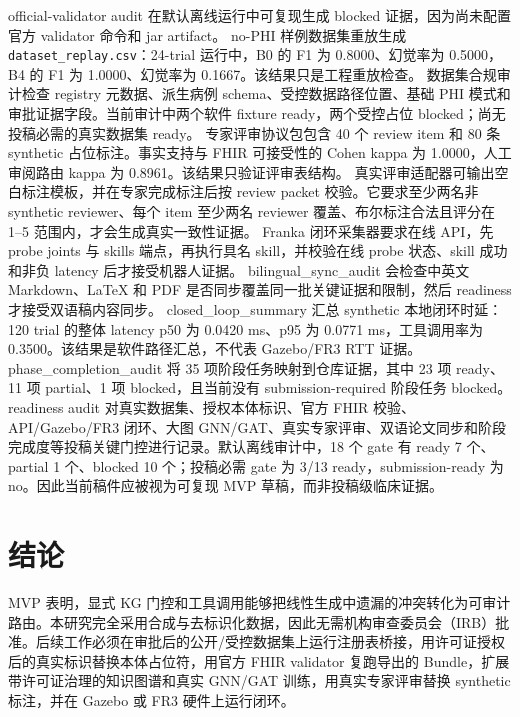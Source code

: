 \documentclass[11pt]{article}
\begin{document}
official-validator audit 在默认离线运行中可复现生成 blocked 证据，因为尚未配置官方 validator 命令和 jar artifact。
no-PHI 样例数据集重放生成 \texttt{dataset\_replay.csv}：24-trial 运行中，B0 的 F1 为 0.8000、幻觉率为 0.5000，B4 的 F1 为 1.0000、幻觉率为 0.1667。该结果只是工程重放检查。
数据集合规审计检查 registry 元数据、派生病例 schema、受控数据路径位置、基础 PHI 模式和审批证据字段。当前审计中两个软件 fixture ready，两个受控占位 blocked；尚无投稿必需的真实数据集 ready。
专家评审协议包包含 40 个 review item 和 80 条 synthetic 占位标注。事实支持与 FHIR 可接受性的 Cohen kappa 为 1.0000，人工审阅路由 kappa 为 0.8961。该结果只验证评审表结构。
真实评审适配器可输出空白标注模板，并在专家完成标注后按 review packet 校验。它要求至少两名非 synthetic reviewer、每个 item 至少两名 reviewer 覆盖、布尔标注合法且评分在 1--5 范围内，才会生成真实一致性证据。
Franka 闭环采集器要求在线 API，先 probe joints 与 skills 端点，再执行具名 skill，并校验在线 probe 状态、skill 成功和非负 latency 后才接受机器人证据。
bilingual\_sync\_audit 会检查中英文 Markdown、LaTeX 和 PDF 是否同步覆盖同一批关键证据和限制，然后 readiness 才接受双语稿内容同步。
closed\_loop\_summary 汇总 synthetic 本地闭环时延：120 trial 的整体 latency p50 为 0.0420 ms、p95 为 0.0771 ms，工具调用率为 0.3500。该结果是软件路径汇总，不代表 Gazebo/FR3 RTT 证据。
phase\_completion\_audit 将 35 项阶段任务映射到仓库证据，其中 23 项 ready、11 项 partial、1 项 blocked，且当前没有 submission-required 阶段任务 blocked。
readiness audit 对真实数据集、授权本体标识、官方 FHIR 校验、API/Gazebo/FR3 闭环、大图 GNN/GAT、真实专家评审、双语论文同步和阶段完成度等投稿关键门控进行记录。默认离线审计中，18 个 gate 有 ready 7 个、partial 1 个、blocked 10 个；投稿必需 gate 为 3/13 ready，submission-ready 为 no。因此当前稿件应被视为可复现 MVP 草稿，而非投稿级临床证据。

\section{结论}
MVP 表明，显式 KG 门控和工具调用能够把线性生成中遗漏的冲突转化为可审计路由。本研究完全采用合成与去标识化数据，因此无需机构审查委员会（IRB）批准。后续工作必须在审批后的公开/受控数据集上运行注册表桥接，用许可证授权后的真实标识替换本体占位符，用官方 FHIR validator 复跑导出的 Bundle，扩展带许可证治理的知识图谱和真实 GNN/GAT 训练，用真实专家评审替换 synthetic 标注，并在 Gazebo 或 FR3 硬件上运行闭环。

\nocite{*}


\end{document}
